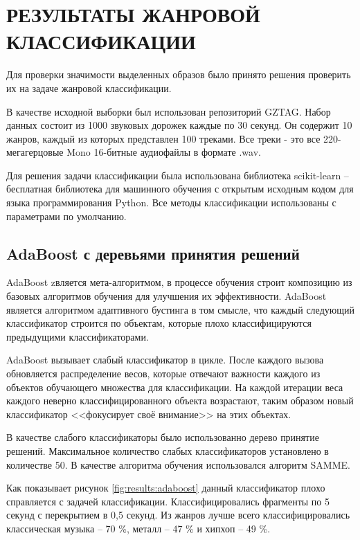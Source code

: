 \section{РЕЗУЛЬТАТЫ ЖАНРОВОЙ КЛАССИФИКАЦИИ}
\label{sec:genre_classification}


Для проверки значимости выделенных образов было принято решения проверить их на задаче жанровой классификации. 

В качестве исходной выборки был использован репозиторий GZTAG. Набор данных состоит из 1000 звуковых дорожек каждые по 30 секунд. Он содержит 10 жанров, каждый из которых представлен 100 треками. Все треки - это все 220-мегагерцовые Mono 16-битные аудиофайлы в формате .wav.


Для решения задачи классификации была использована библиотека scikit-learn -- бесплатная библиотека для машинного обучения с открытым исходным кодом для языка программирования Python. Все методы классификации использованы с параметрами по умолчанию. 

\subsection{AdaBoost с деревьями принятия решений}

AdaBoost zвляется мета-алгоритмом, в процессе обучения строит композицию из базовых алгоритмов обучения для улучшения их эффективности. AdaBoost является алгоритмом адаптивного бустинга в том смысле, что каждый следующий классификатор строится по объектам, которые плохо классифицируются предыдущими классификаторами.

AdaBoost вызывает слабый классификатор в цикле. После каждого вызова обновляется распределение весов, которые отвечают важности каждого из объектов обучающего множества для классификации. На каждой итерации веса каждого неверно классифицированного объекта возрастают, таким образом новый классификатор <<фокусирует своё внимание>> на этих объектах.

В качестве слабого классификаторы было использованно дерево принятие решений. Максимальное количество слабых классификаторов установлено в количестве 50. В качестве алгоритма обучения использовался алгоритм SAMME.


Как показывает рисунок \ref{fig:results:adaboost} данный классификатор плохо справляется с задачей классификации. Классифицировались фрагменты по 5 секунд с перекрытием в 0,5 секунд. Из жанров лучше всего классифицировались классическая музыка -- 70 \%, металл -- 47 \% и хипхоп -- 49 \%. 

